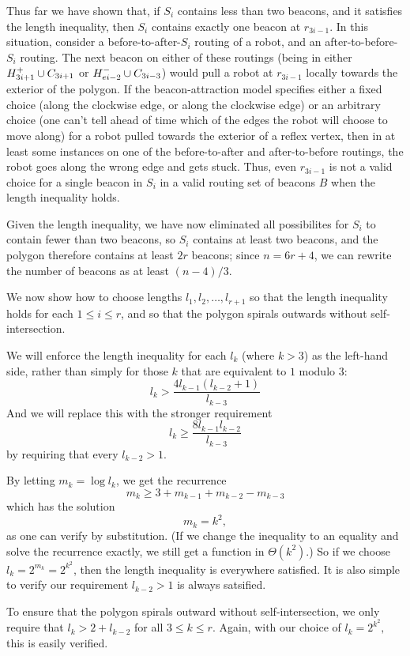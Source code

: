 \documentclass{article}
\begin{document}
Thus far we have shown that, if $S_i$ contains less than two beacons, and
it satisfies the length inequality, then $S_i$ contains exactly one beacon
at $r_{3i-1}$.  
In this situation, consider a before-to-after-$S_i$ routing of a robot, and an
after-to-before-$S_i$ routing.
The next beacon on either of these routings
(being in either $H^{+}_{3i+1} \cup C_{3i+1}$ 
 or $H^{-}_{ei-2} \cup C_{3i-3}$)
would pull a robot at $r_{3i-1}$
locally towards the exterior of the polygon.
If the beacon-attraction model specifies either a fixed choice (along the
clockwise edge, or along the clockwise edge) or an arbitrary choice (one can't
tell ahead of time which of the edges the robot will choose to move along)
for a robot pulled towards the exterior of a reflex vertex, then in at least
some instances on one of the before-to-after and after-to-before routings, the
robot goes along the wrong edge and gets stuck.
Thus, even $r_{3i-1}$ is not a valid choice for a single beacon in $S_i$ in a
valid routing set of beacons $B$ when the length inequality holds.

Given the length inequality, we have now eliminated all possibilites for $S_i$
to contain fewer than two beacons, so $S_i$ contains at least two beacons, and
the polygon therefore contains at least $2r$ beacons; since $n = 6r + 4$, we can
rewrite the number of beacons as at least $(n-4)/3$.

We now show how to choose lengths $l_1, l_2, \ldots, l_{r+1}$ so that the length
inequality holds for each $1 \leq i \leq r$, and so that the polygon spirals
outwards without self-intersection.

We will enforce the length inequality for each $l_k$ (where $k > 3$) as the
left-hand side, rather than simply for those $k$ that are equivalent to $1$ modulo $3$:
\[
	l_{k} > \frac{4 l_{k-1} (l_{k-2}+1)}{l_{k-3}}
\]
And we will replace this with the stronger requirement
\[
	l_{k} \geq \frac{8 l_{k-1} l_{k-2}}{l_{k-3}}
\]
by requiring that every $l_{k-2} > 1$.

By letting $m_k = \log l_k$, we get the recurrence
\[
	m_k \geq 3 + m_{k-1} + m_{k-2} - m_{k-3}
\]
which has the solution
\[
	m_k = k^2,
\]
as one can verify by substitution.
(If we change the inequality to an equality and solve the recurrence exactly,
we still get a function in $\Theta(k^2)$.)
So if we choose $l_k = 2^{m_k} = 2^{k^2}$, then the length inequality is
everywhere satisfied.
It is also simple to verify our requirement $l_{k-2} > 1$ is always satsified.

To ensure that the polygon spirals outward without
self-intersection, we only require that $l_k > 2 + l_{k-2}$ for all $3 \leq k
\leq r$.  Again, with our choice of $l_k = 2^{k^2},$ this is easily verified.
\end{document}

